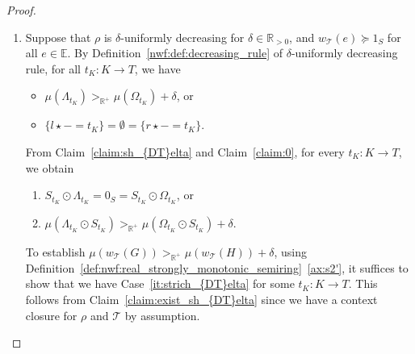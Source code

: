 \begin{proof}
\begin{enumerate}
        \item  
            Suppose that $\rho$ is $\delta$-uniformly decreasing for $\delta \mathop{\in} \mathbb{R}_{>0}$, and $w_\mathcal{T}(e) \mathop{\succeq} 1_S$ for all $e \mathop{\in} \mathbb{E}$. By Definition~\ref{nwf:def:decreasing_rule} of $\delta$-uniformly decreasing rule,
            for all $t_K : K \mathop{\to} T$, we have  
                            \begin{itemize}                                
                                \item $\mu(\Lambda_{t_K}) >_{\mathbb{R}^+} \mu(\Omega_{t_K})\mathop{+}\delta$,
                                 or
                                \item $\{l \mathop{\star} - \mathop{=} t_K\} \mathop{=} \emptyset \mathop{=} \{r \mathop{\star} - \mathop{=} t_K\}$.
                            \end{itemize}
            From Claim~\ref{claim:sh_{DT}elta} and Claim~\ref{claim:0}, for every \( t_K: K \mathop{\rightarrow} T \), we obtain
            \begin{enumerate}[label=(\roman*)]
                \item $S_{t_K} \mathop{\odot} \Lambda_{t_K} \mathop{=} 0_S \mathop{=}  S_{t_K} \mathop{\odot} \Omega_{t_K}$, or
                \item  \label{it:strich_{DT}elta}  $\mu(\Lambda_{t_K} \mathop{\odot} S_{t_K}) >_{\mathbb{R}^+} \mu(\Omega_{t_K} \mathop{\odot} S_{t_K})\mathop{+}\delta$.
            \end{enumerate}
            To establish $ \mu(w_\mathcal{T}(G)) >_{\mathbb{R}^+} \mu(w_\mathcal{T}(H))\mathop{+}\delta$, using Definition~\ref{def:nwf:real_strongly_monotonic_semiring}~\eqref{ax:s2'}, 
            it suffices to show that we have Case~\ref{it:strich_{DT}elta} for some $t_K : K \mathop{\to} T$.
            This follows from Claim~\ref{claim:exist_sh_{DT}elta} since we have a context closure for $\rho$ and $\mathcal{T}$ by assumption.

\end{enumerate}
\end{proof}
